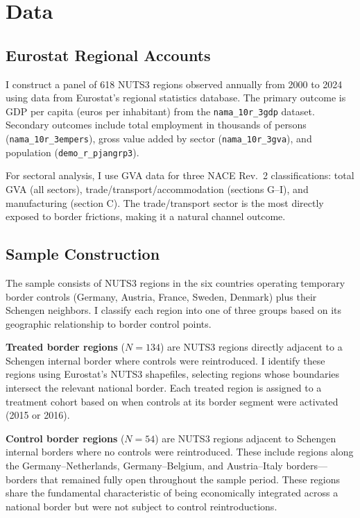 \documentclass[12pt]{article}
\begin{document}
\section{Data}

\subsection{Eurostat Regional Accounts}

I construct a panel of 618 NUTS3 regions observed annually from 2000 to 2024 using data from Eurostat's regional statistics database. The primary outcome is GDP per capita (euros per inhabitant) from the \texttt{nama\_10r\_3gdp} dataset. Secondary outcomes include total employment in thousands of persons (\texttt{nama\_10r\_3empers}), gross value added by sector (\texttt{nama\_10r\_3gva}), and population (\texttt{demo\_r\_pjangrp3}).

For sectoral analysis, I use GVA data for three NACE Rev.\ 2 classifications: total GVA (all sectors), trade/transport/accommodation (sections G--I), and manufacturing (section C). The trade/transport sector is the most directly exposed to border frictions, making it a natural channel outcome.

\subsection{Sample Construction}

The sample consists of NUTS3 regions in the six countries operating temporary border controls (Germany, Austria, France, Sweden, Denmark) plus their Schengen neighbors. I classify each region into one of three groups based on its geographic relationship to border control points.

\textbf{Treated border regions} ($N = 134$) are NUTS3 regions directly adjacent to a Schengen internal border where controls were reintroduced. I identify these regions using Eurostat's NUTS3 shapefiles, selecting regions whose boundaries intersect the relevant national border. Each treated region is assigned to a treatment cohort based on when controls at its border segment were activated (2015 or 2016).

\textbf{Control border regions} ($N = 54$) are NUTS3 regions adjacent to Schengen internal borders where no controls were reintroduced. These include regions along the Germany--Netherlands, Germany--Belgium, and Austria--Italy borders---borders that remained fully open throughout the sample period. These regions share the fundamental characteristic of being economically integrated across a national border but were not subject to control reintroductions.
\end{document}
